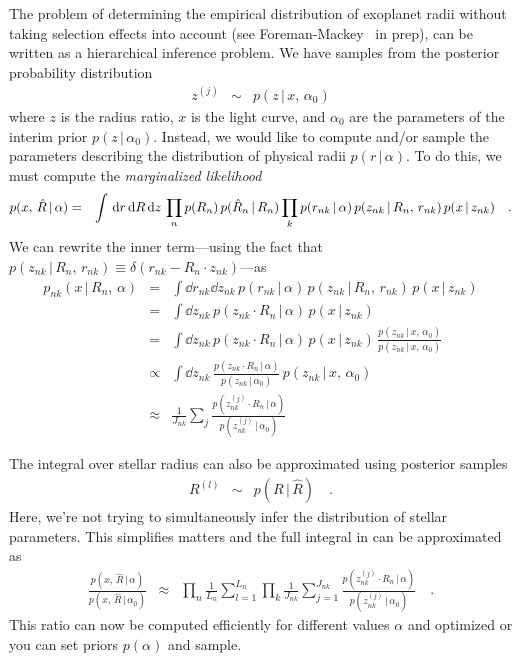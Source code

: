 \documentclass[12pt,preprint]{aastex}
\begin{document}
The problem of determining the empirical distribution of exoplanet radii
without taking selection effects into account (see Foreman-Mackey \etal\ in
prep), can be written as a hierarchical inference problem.
We have samples from the posterior probability distribution
\begin{eqnarray}
z^{(j)} &\sim& p(z\,|\,x,\,\alpha_0)
\end{eqnarray}
where $z$ is the radius ratio, $x$ is the light curve, and $\alpha_0$ are the
parameters of the interim prior $p(z\,|\,\alpha_0)$.
Instead, we would like to compute and/or sample the parameters describing the
distribution of physical radii $p(r\,|\,\alpha)$.
To do this, we must compute the \emph{marginalized likelihood}
\begin{eqnarray}\eqlabel{marg-like}
p(x,\,\hat{R}\,|\,\alpha) &=&
    \int \dd r\dd R\dd z\,\prod_n p(R_n)\,p(\hat{R}_n\,|\,R_n)
        \prod_k p(r_{nk}\,|\,\alpha)\,p(z_{nk}\,|\,R_n,\,r_{nk})\,
                p(x\,|\,z_{nk}) \quad.
\end{eqnarray}
We can rewrite the inner term---using the fact that
$p(z_{nk}\,|\,R_n,\,r_{nk})\equiv\delta(r_{nk}-R_n\cdot z_{nk})$---as
\begin{eqnarray}
p_{nk}(x\,|\,R_n,\,\alpha)&=&
\int \dd r_{nk}\dd z_{nk}\,p(r_{nk}\,|\,\alpha)\,p(z_{nk}\,|\,R_n,\,r_{nk})\,
        p(x\,|\,z_{nk}) \nonumber\\
&=&
\int \dd z_{nk}\,p(z_{nk} \cdot R_n\,|\,\alpha)\,p(x\,|\,z_{nk}) \nonumber\\
&=&
\int \dd z_{nk}\,p(z_{nk}\cdot R_n\,|\,\alpha)\,p(x\,|\,z_{nk})\,
\frac{p(z_{nk}\,|\,x,\,\alpha_0)}{p(z_{nk}\,|\,x,\,\alpha_0)} \nonumber\\
&\propto&
\int \dd z_{nk}\,\frac{p(z_{nk}\cdot R_n\,|\,\alpha)}{p(z_{nk}\,|\,\alpha_0)}\,
p(z_{nk}\,|\,x,\,\alpha_0) \nonumber\\
&\approx&
\frac{1}{J_{nk}}
\sum_j \frac{p(z_{nk}^{(j)}\cdot R_n\,|\,\alpha)}{p(z_{nk}^{(j)}\,|\,\alpha_0)}
\end{eqnarray}

The integral over stellar radius can also be approximated using posterior
samples
\begin{eqnarray}
R^{(l)} &\sim& p(R\,|\,\hat{R}) \quad.
\end{eqnarray}
Here, we're not trying to simultaneously infer the distribution of stellar
parameters.
This simplifies matters and the full integral in  can be
approximated as
\begin{eqnarray}
\frac{p(x,\,\hat{R}\,|\,\alpha)}{p(x,\,\hat{R}\,|\,\alpha_0)}
&\approx& \prod_n \frac{1}{L_n} \sum_{l=1}^{L_n} \prod_k
\frac{1}{J_{nk}} \sum_{j=1}^{J_{nk}}
\frac{p(z_{nk}^{(j)}\cdot R_n\,|\,\alpha)}{p(z_{nk}^{(j)}\,|\,\alpha_0)}
\quad.
\end{eqnarray}
This ratio can now be computed efficiently for different values $\alpha$ and
optimized or you can set priors $p(\alpha)$ and sample.
\end{document}
